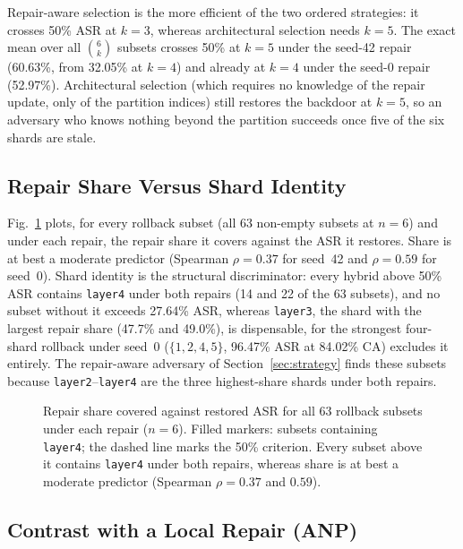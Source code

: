 \documentclass[conference,a4paper]{IEEEtran}  %
\newif\ifincludeanp      \includeanpfalse   %
\begin{document}
Repair-aware selection is the more efficient of the two ordered strategies: it crosses 50\% ASR at $k\!=\!3$, whereas architectural selection needs $k\!=\!5$. The exact mean over all $\binom{6}{k}$ subsets crosses 50\% at $k\!=\!5$ under the seed-42 repair (60.63\%, from 32.05\% at $k=4$) and already at $k\!=\!4$ under the seed-0 repair (52.97\%). Architectural selection (which requires no knowledge of the repair update, only of the partition indices) still restores the backdoor at $k\!=\!5$, so an adversary who knows nothing beyond the partition succeeds once five of the six shards are stale.

\subsection{Repair Share Versus Shard Identity}
\label{sec:locality}

Fig.~\ref{fig:locality_asr} plots, for every rollback subset (all 63 non-empty subsets at $n\!=\!6$) and under each repair, the repair share it covers against the ASR it restores. Share is at best a moderate predictor (Spearman $\rho = 0.37$ for seed~42 and $\rho = 0.59$ for seed~0). Shard identity is the structural discriminator: every hybrid above 50\% ASR contains \texttt{layer4} under both repairs (14 and 22 of the 63 subsets), and no subset without it exceeds 27.64\% ASR, whereas \texttt{layer3}, the shard with the largest repair share (47.7\% and 49.0\%), is dispensable, for the strongest four-shard rollback under seed~0 ($\{1,2,4,5\}$, 96.47\% ASR at 84.02\% CA) excludes it entirely. The repair-aware adversary of Section~\ref{sec:strategy} finds these subsets because \texttt{layer2}--\texttt{layer4} are the three highest-share shards under both repairs.

\begin{figure}[t]
\centering

\caption{Repair share covered against restored ASR for all 63 rollback subsets under each repair ($n=6$). Filled markers: subsets containing \texttt{layer4}; the dashed line marks the 50\% criterion. Every subset above it contains \texttt{layer4} under both repairs, whereas share is at best a moderate predictor (Spearman $\rho = 0.37$ and $0.59$).}
\label{fig:locality_asr}
\end{figure}

\ifincludeanp
\subsection{Contrast with a Local Repair (ANP)}
\label{sec:anp}
\end{document}
